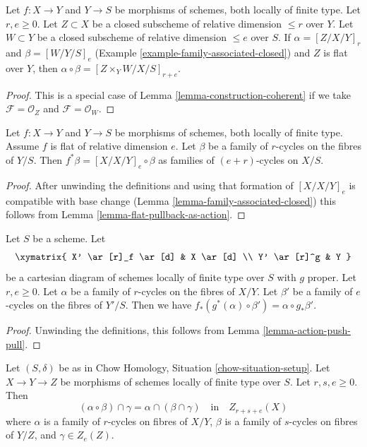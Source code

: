\begin{lemma}
\label{lemma-construction-closed}
Let $f : X \to Y$ and $Y \to S$ be morphisms of schemes, both locally of
finite type. Let $r, e \geq 0$. Let $Z \subset X$ be a closed
subscheme of relative dimension $\leq r$ over $Y$.
Let $W \subset Y$ be a closed subscheme of relative dimension $\leq e$
over $S$. If $\alpha = [Z/X/Y]_r$ and $\beta = [W/Y/S]_e$
(Example \ref{example-family-associated-closed}) and $Z$ is flat over $Y$,
then $\alpha \circ \beta = [Z \times_Y W/X/S]_{r + e}$.
\end{lemma}

\begin{proof}
This is a special case of Lemma \ref{lemma-construction-coherent}
if we take $\mathcal{F} = \mathcal{O}_Z$ and $\mathcal{F} = \mathcal{O}_W$.
\end{proof}

\begin{lemma}
\label{lemma-flat-pullback-as-composition}
Let $f : X \to Y$ and $Y \to S$ be morphisms of schemes, both locally of
finite type. Assume $f$ is flat of relative dimension $e$. Let $\beta$ be
a family of $r$-cycles on the fibres of $Y/S$. Then
$f^*\beta = [X/X/Y]_e \circ \beta$
as families of $(e + r)$-cycles on $X/S$.
\end{lemma}

\begin{proof}
After unwinding the definitions and using that formation of
$[X/X/Y]_e$ is compatible with base change
(Lemma \ref{lemma-family-associated-closed}) this follows from
Lemma \ref{lemma-flat-pullback-as-action}.
\end{proof}

\begin{lemma}
\label{lemma-construction-push-pull}
Let $S$ be a scheme. Let
$$
\xymatrix{
X' \ar[r]_f \ar[d] & X \ar[d] \\
Y' \ar[r]^g & Y
}
$$
be a cartesian diagram of schemes locally of finite type over $S$
with $g$ proper. Let $r, e \geq 0$. Let $\alpha$ be a family of
$r$-cycles on the fibres of $X/Y$. Let $\beta'$ be a family of
$e$-cycles on the fibres of $Y'/S$. Then we have
$f_*(g^*(\alpha) \circ \beta') = \alpha \circ g_*\beta'$.
\end{lemma}

\begin{proof}
Unwinding the definitions, this follows from
Lemma \ref{lemma-action-push-pull}.
\end{proof}

\begin{lemma}
\label{lemma-construction-composition}
Let $(S, \delta)$ be as in Chow Homology, Situation \ref{chow-situation-setup}.
Let $X \to Y \to Z$ be morphisms of schemes locally of finite type over $S$.
Let $r, s, e \geq 0$. Then
$$
(\alpha \circ \beta) \cap \gamma = \alpha \cap (\beta \cap \gamma)
\quad\text{in}\quad Z_{r + s + e}(X)
$$
where $\alpha$ is a family of $r$-cycles on fibres of $X/Y$,
$\beta$ is a family of $s$-cycles on fibres of $Y/Z$, and $\gamma \in Z_e(Z)$.
\end{lemma}

